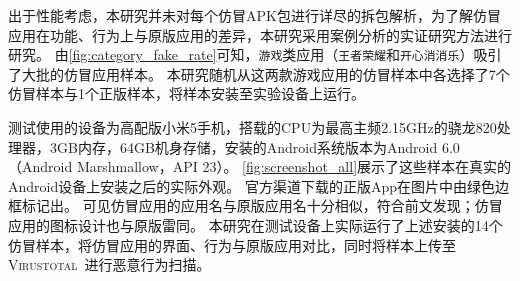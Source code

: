 出于性能考虑，本研究并未对每个仿冒APK包进行详尽的拆包解析，为了解仿冒应用在功能、行为上与原版应用的差异，本研究采用案例分析的实证研究方法进行研究。
由\autoref{fig:category_fake_rate}可知，\texttt{游戏}类应用（\texttt{王者荣耀}和\texttt{开心消消乐}）吸引了大批的仿冒应用样本。
本研究随机从这两款游戏应用的仿冒样本中各选择了7个仿冒样本与1个正版样本，将样本安装至实验设备上运行。

测试使用的设备为高配版小米5手机，搭载的CPU为最高主频2.15GHz的骁龙820处理器，3GB内存，64GB机身存储，安装的Android系统版本为Android 6.0（Android Marshmallow，API 23）。
\autoref{fig:screenshot_all}展示了这些样本在真实的Android设备上安装之后的实际外观。
官方渠道下载的正版App在图片中由绿色边框标记出。
可见仿冒应用的应用名与原版应用名十分相似，符合前文发现；仿冒应用的图标设计也与原版雷同。
本研究在测试设备上实际运行了上述安装的14个仿冒样本，将仿冒应用的界面、行为与原版应用对比，同时将样本上传至\textsc{Virustotal}~\cite{virustotal}进行恶意行为扫描。

